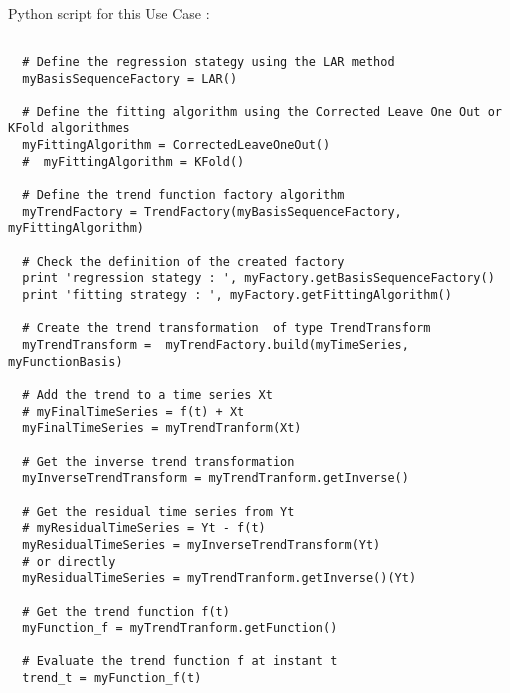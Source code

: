 \textspace\\
Python script for this Use Case :

\begin{lstlisting}

  # Define the regression stategy using the LAR method
  myBasisSequenceFactory = LAR()

  # Define the fitting algorithm using the Corrected Leave One Out or KFold algorithmes
  myFittingAlgorithm = CorrectedLeaveOneOut()
  #  myFittingAlgorithm = KFold()

  # Define the trend function factory algorithm 
  myTrendFactory = TrendFactory(myBasisSequenceFactory, myFittingAlgorithm)

  # Check the definition of the created factory
  print 'regression stategy : ', myFactory.getBasisSequenceFactory()
  print 'fitting strategy : ', myFactory.getFittingAlgorithm()
 
  # Create the trend transformation  of type TrendTransform
  myTrendTransform =  myTrendFactory.build(myTimeSeries, myFunctionBasis)

  # Add the trend to a time series Xt
  # myFinalTimeSeries = f(t) + Xt
  myFinalTimeSeries = myTrendTranform(Xt)

  # Get the inverse trend transformation
  myInverseTrendTransform = myTrendTranform.getInverse() 
  
  # Get the residual time series from Yt 
  # myResidualTimeSeries = Yt - f(t)
  myResidualTimeSeries = myInverseTrendTransform(Yt)
  # or directly
  myResidualTimeSeries = myTrendTranform.getInverse()(Yt)

  # Get the trend function f(t)
  myFunction_f = myTrendTranform.getFunction()

  # Evaluate the trend function f at instant t
  trend_t = myFunction_f(t)

\end{lstlisting}

